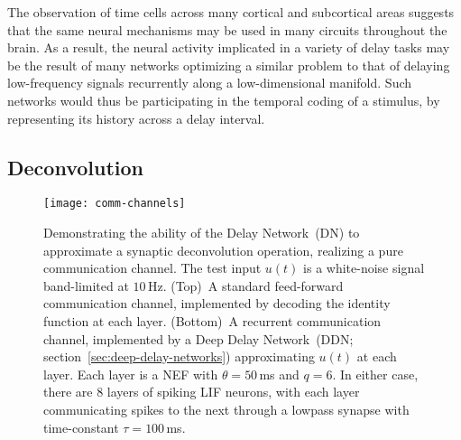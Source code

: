 The observation of time cells across many cortical and subcortical areas suggests that the same neural mechanisms may be used in many circuits throughout the brain.
As a result, the neural activity implicated in a variety of delay tasks may be the result of many networks optimizing a similar problem to that of delaying low-frequency signals recurrently along a low-dimensional manifold.
Such networks would thus be participating in the temporal coding of a stimulus, by representing its history across a delay interval.

\subsection{Deconvolution}
\label{sec:deconvolution}

\begin{figure}
    \centering
    \texttt{[image: comm-channels]}
     
    \caption{\label{fig:comm-channels} 
      Demonstrating the ability of the Delay Network~(DN) to approximate a synaptic deconvolution operation, realizing a pure communication channel.
      The test input $u(t)$ is a white-noise signal band-limited at $10$\,Hz.
      (Top)~A standard feed-forward communication channel, implemented by decoding the identity function at each layer.
      (Bottom)~A recurrent communication channel, implemented by a Deep Delay Network~(DDN; section~\ref{sec:deep-delay-networks}) approximating $u(t)$ at each layer. Each layer is a NEF with $\theta = 50$\,ms and $q = 6$.
      In either case, there are $8$ layers of  spiking LIF neurons, with each layer communicating spikes to the next through a lowpass synapse with time-constant $\tau = 100$\,ms.
    }
\end{figure}


